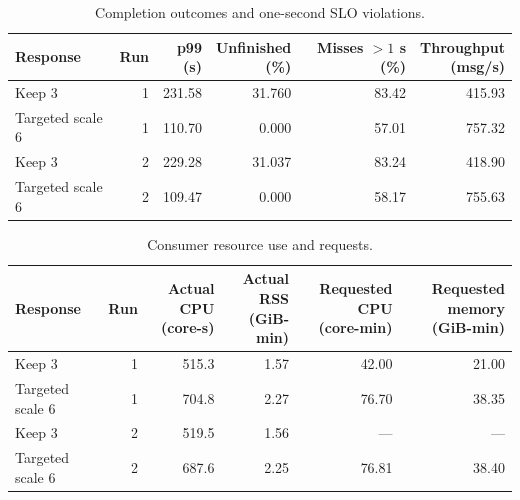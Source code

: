 \begin{table}[!htbp]
\centering\small
\setlength{\tabcolsep}{3pt}
\renewcommand{\arraystretch}{1.12}
\begin{tabular}{@{}lrrrrr@{}}
\toprule
Response & Run & \shortstack{p99\\(s)} & \shortstack{Unfinished\\(\%)} & \shortstack{Misses $>1$ s\\(\%)} & \shortstack{Throughput\\(msg/s)}\\
\midrule
Keep 3 & 1 & 231.58 & 31.760 & 83.42 & 415.93\\
Targeted scale 6 & 1 & 110.70 & 0.000 & 57.01 & 757.32\\
Keep 3 & 2 & 229.28 & 31.037 & 83.24 & 418.90\\
Targeted scale 6 & 2 & 109.47 & 0.000 & 58.17 & 755.63\\
\bottomrule
\end{tabular}
\caption{Completion outcomes and one-second SLO violations.}
\label{tab:short-targeted-scaling-outcomes}
\end{table}
\begin{table}[!htbp]
\centering\small
\setlength{\tabcolsep}{3pt}
\renewcommand{\arraystretch}{1.12}
\begin{tabular}{@{}lrrrrr@{}}
\toprule
Response & Run & \shortstack{Actual CPU\\(core-s)} & \shortstack{Actual RSS\\(GiB-min)} & \shortstack{Requested CPU\\(core-min)} & \shortstack{Requested memory\\(GiB-min)}\\
\midrule
Keep 3 & 1 & 515.3 & 1.57 & 42.00 & 21.00\\
Targeted scale 6 & 1 & 704.8 & 2.27 & 76.70 & 38.35\\
Keep 3 & 2 & 519.5 & 1.56 & --- & ---\\
Targeted scale 6 & 2 & 687.6 & 2.25 & 76.81 & 38.40\\
\bottomrule
\end{tabular}
\caption{Consumer resource use and requests.}
\label{tab:short-targeted-scaling-resources}
\end{table}

